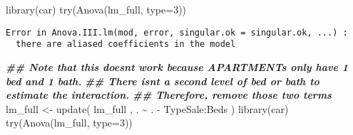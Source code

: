 \documentclass[
  12pt,
]{article}
\newenvironment{Shaded}{\begin{snugshade}}{\end{snugshade}}
\newcommand{\AttributeTok}[1]{\textcolor[rgb]{0.77,0.63,0.00}{#1}}
\newcommand{\DecValTok}[1]{\textcolor[rgb]{0.00,0.00,0.81}{#1}}
\newcommand{\DocumentationTok}[1]{\textcolor[rgb]{0.56,0.35,0.01}{\textbf{\textit{#1}}}}
\newcommand{\FunctionTok}[1]{\textcolor[rgb]{0.00,0.00,0.00}{#1}}
\newcommand{\NormalTok}[1]{#1}
\newcommand{\OtherTok}[1]{\textcolor[rgb]{0.56,0.35,0.01}{#1}}
\newcommand{\SpecialCharTok}[1]{\textcolor[rgb]{0.00,0.00,0.00}{#1}}
\begin{document}
\begin{Shaded}
\begin{Highlighting}[]
  \FunctionTok{library}\NormalTok{(car)}
  \FunctionTok{try}\NormalTok{(}\FunctionTok{Anova}\NormalTok{(lm\_full, }\AttributeTok{type=}\DecValTok{3}\NormalTok{))}
\end{Highlighting}
\end{Shaded}

\begin{verbatim}
Error in Anova.III.lm(mod, error, singular.ok = singular.ok, ...) : 
  there are aliased coefficients in the model
\end{verbatim}

\begin{Shaded}
\begin{Highlighting}[]
  \DocumentationTok{\#\# Note that this doesn\textquotesingle{}t work because APARTMENTs only have 1 bed and 1 bath.}
  \DocumentationTok{\#\# There isn\textquotesingle{}t a second level of bed or bath to estimate the interaction.}
  \DocumentationTok{\#\# Therefore, remove those two terms}
\NormalTok{  lm\_full }\OtherTok{\textless{}{-}}
    \FunctionTok{update}\NormalTok{(}
\NormalTok{      lm\_full}
\NormalTok{    , . }\SpecialCharTok{\textasciitilde{}}\NormalTok{ . }\SpecialCharTok{{-}}\NormalTok{ TypeSale}\SpecialCharTok{:}\NormalTok{Beds}
\NormalTok{    )}
  \FunctionTok{library}\NormalTok{(car)}
  \FunctionTok{try}\NormalTok{(}\FunctionTok{Anova}\NormalTok{(lm\_full, }\AttributeTok{type=}\DecValTok{3}\NormalTok{))}
\end{Highlighting}
\end{Shaded}
\end{document}
